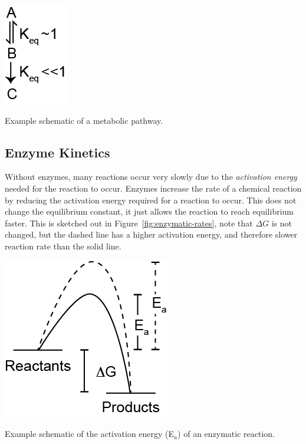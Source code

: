 \documentclass{tufte-handout}
\begin{document}
\begin{marginfigure}
\includegraphics[width=0.5\marginparwidth]{figures/committed-step.png}\
\caption{Example schematic of a metabolic pathway.}\label{fig:committed-step}
\end{marginfigure}

\subsection{Enzyme Kinetics}

Without enzymes, many reactions occur very slowly due to the \emph{activation energy} needed for the reaction to occur.  Enzymes increase the rate of a chemical reaction by reducing the activation energy required for a reaction to occur.  This does not change the equilibrium constant, it just allows the reaction to reach equilibrium faster.  This is sketched out in Figure~\ref{fig:enzymatic-rates}, note that $\Delta G$ is not changed, but the dashed line has a higher activation energy, and therefore slower reaction rate than the solid line.  

\begin{marginfigure}
\includegraphics[width=\marginparwidth]{figures/enzymatic-rates.png}\
\caption{Example schematic of the activation energy (E$_a$) of an enzymatic reaction.}\label{fig:enzymatic-rates}
\end{marginfigure}
\end{document}
